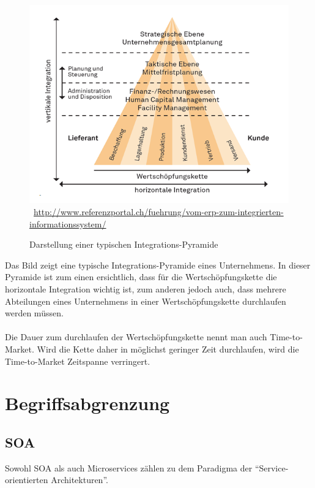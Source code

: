 \begin{figure}[htb]
    \centering 
    \includegraphics[width=\linewidth]{content/images/integrations-pyramide}\
    \quelle\url{http://www.referenzportal.ch/fuehrung/vom-erp-zum-integrierten-informationssystem/}
    \caption[Darstellung einer typischen Integrations-Pyramide]{Darstellung einer typischen Integrations-Pyramide\\}
    \label{fig:integrations-pyramide} 
\end{figure} 
Das Bild zeigt eine typische Integrations-Pyramide eines Unternehmens. In dieser Pyramide ist zum einen ersichtlich, dass für die Wertschöpfungskette die horizontale Integration wichtig ist, zum anderen jedoch auch, dass mehrere Abteilungen eines Unternehmens in einer Wertschöpfungskette durchlaufen werden müssen.
\\\\
Die Dauer zum durchlaufen der Wertschöpfungskette nennt man auch Time-to-Market. Wird die Kette daher in möglichst geringer Zeit durchlaufen, wird die Time-to-Market Zeitspanne verringert.

\section{Begriffsabgrenzung}
\label{sec:Begriffsabgrenzung}

\subsection*{SOA}
Sowohl SOA als auch Microservices zählen zu dem Paradigma der "`Service-orientierten Architekturen"'.

